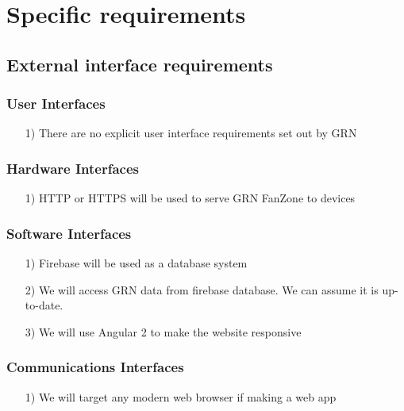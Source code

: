 \documentclass[10pt,a4paper]{article}
\begin{document}
\newpage
\section{Specific requirements}
\subsection{External interface requirements}

\subsubsection{User Interfaces}
\begin{itemize}
\item[1)]
There are no explicit user interface requirements set out by GRN
\end{itemize}

\subsubsection{Hardware Interfaces}
\begin{itemize}
\item[1)]
HTTP or HTTPS will be used to serve GRN FanZone to devices
\end{itemize}

\subsubsection{Software Interfaces}
\begin{itemize}
\item[1)]
Firebase will be used as a database system

\item[2)]
We will access GRN data from firebase database. We can assume it is up-to-date.


\item[3)]
We will use Angular 2 to make the website responsive
\end{itemize}

\subsubsection{Communications Interfaces}
\begin{itemize}
\item[1)]
We will target any modern web browser if making a web app
\end{itemize}
\end{document}
